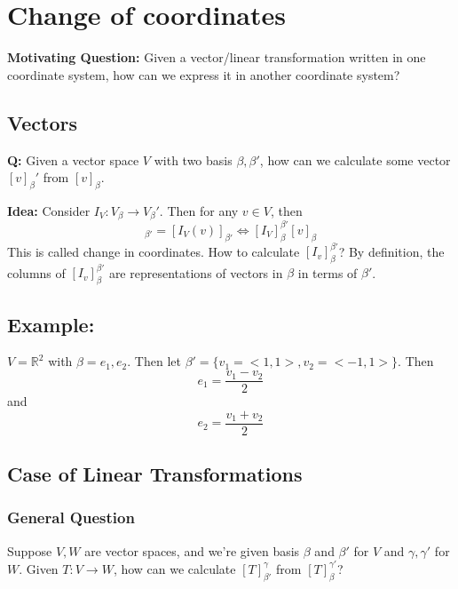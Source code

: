 \documentclass{article}
\newtheorem{one minute paper}[theorem]{One Minute Paper}
\begin{document}
\section*{Change of coordinates}

\textbf{Motivating Question:} Given a vector/linear transformation written in one coordinate system, how can we express it in another coordinate system?

\subsection*{Vectors}

\textbf{Q:} Given a vector space $V$ with two basis $\beta, \beta'$, how can we calculate some vector $[v]_\beta'$ from $[v]_\beta$. 

\textbf{Idea:} Consider $I_V: V_\beta \rightarrow V_\beta'$. Then for any $v \in V$, then 
\begin{equation}
    [v]_{\beta'} = [I_V(v)]_{\beta'} \iff [I_V]_\beta^{\beta'} [v]_\beta
\end{equation}
This is called change in coordinates. How to calculate $[I_v]_\beta^{\beta'}$? By definition, the columns of $[I_v]_\beta^{\beta'}$ are representations of vectors in $\beta$ in terms of $\beta'$. 

\subsection*{Example:}

$V = \mathbb{R}^2$ with $\beta = {e_1, e_2}$. Then let $\beta' = \{v_1 = <1,1>, v_2 = <-1,1>\}$. Then 
\begin{equation}
    e_1 = \frac{v_1 - v_2}{2}
\end{equation}
and 
\begin{equation}
    e_2 = \frac{v_1 + v_2}{2}
\end{equation}

\subsection*{Case of Linear Transformations}

\subsubsection*{General Question}
Suppose $V, W$ are vector spaces, and we're given basis $\beta$ and $\beta'$ for $V$ and $\gamma, \gamma'$ for $W$. Given $T: V \rightarrow W$, how can we calculate $[T]_{\beta'}^\gamma$ from $[T]_\beta^{\gamma'}$?
\end{document}
